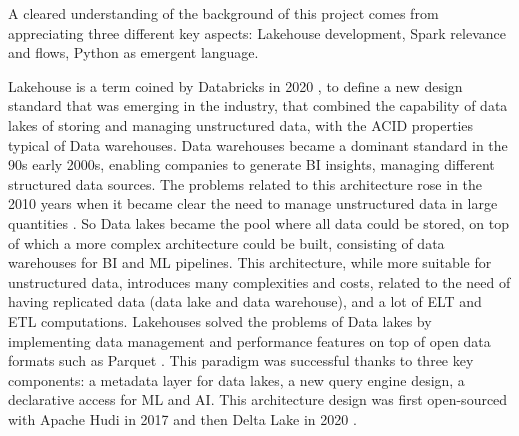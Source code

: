 A cleared understanding of the background of this project comes from appreciating three different key aspects: Lakehouse development, Spark relevance and flows, Python as emergent language.

Lakehouse is a term coined by Databricks in 2020 \cite{lakehouse2021}, to define a new design standard that was emerging in the industry, that combined the capability of data lakes of storing and managing unstructured data, with the \gls{ACID} properties typical of Data warehouses.
Data warehouses became a dominant standard in the 90s early 2000s, enabling companies to generate \gls{BI} insights, managing different structured data sources. The problems related to this architecture rose in the 2010 years when it became clear the need to manage unstructured data in large quantities \cite{ederUnstructuredData802008}. 
So Data lakes became the pool where all data could be stored, on top of which a more complex architecture could be built, consisting of data warehouses for \gls{BI} and \gls{ML} pipelines.
This architecture, while more suitable for unstructured data, introduces many complexities and costs, related to the need of having replicated data (data lake and data warehouse), and a lot of \gls{ELT} and \gls{ETL} computations.
Lakehouses solved the problems of Data lakes by implementing data management and performance features on top of open data formats such as Parquet \cite{DremelMadeSimple}. This paradigm was successful thanks to three key components: a metadata layer for data lakes, a new query engine design, a declarative access for \gls{ML} and \gls{AI}. This architecture design was first open-sourced with Apache Hudi in 2017 \cite{rajaperumalUberEngineeringIncremental2017} and then Delta Lake in 2020 \cite{armbrustDeltaLakeHighperformance2020}.


